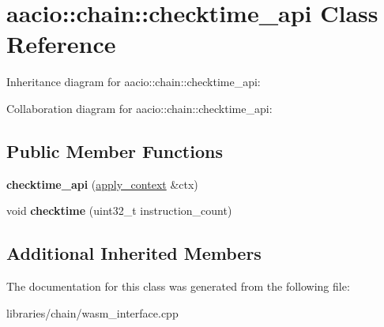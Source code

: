 \hypertarget{classaacio_1_1chain_1_1checktime__api}{}\section{aacio\+:\+:chain\+:\+:checktime\+\_\+api Class Reference}
\label{classaacio_1_1chain_1_1checktime__api}


Inheritance diagram for aacio\+:\+:chain\+:\+:checktime\+\_\+api\+:


Collaboration diagram for aacio\+:\+:chain\+:\+:checktime\+\_\+api\+:
\subsection*{Public Member Functions}
\begin{DoxyCompactItemize}
\item 
\mbox{\label{classaacio_1_1chain_1_1checktime__api_a8b4e56bccdf13dcbdf34355d7719dfb0}} 
{\bfseries checktime\+\_\+api} (\mbox{\hyperlink{classaacio_1_1chain_1_1apply__context}{apply\+\_\+context}} \&ctx)
\item 
\mbox{\label{classaacio_1_1chain_1_1checktime__api_a32bd190f21c71d6aaec6e96cd6a61a31}} 
void {\bfseries checktime} (uint32\+\_\+t instruction\+\_\+count)
\end{DoxyCompactItemize}
\subsection*{Additional Inherited Members}


The documentation for this class was generated from the following file\+:\begin{DoxyCompactItemize}
\item 
libraries/chain/wasm\+\_\+interface.\+cpp\end{DoxyCompactItemize}
